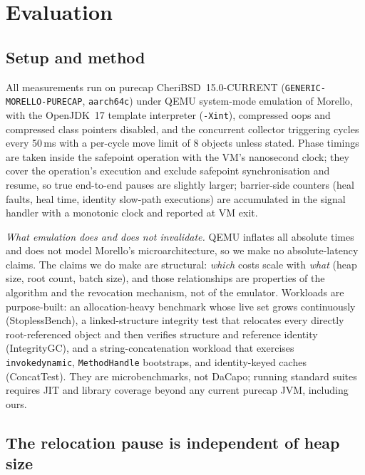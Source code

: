 \documentclass[acmsmall,nonacm,screen]{acmart}
\begin{document}
\section{Evaluation}
\label{sec:eval}

\subsection{Setup and method}
\label{sec:eval:setup}

All measurements run on purecap CheriBSD~15.0-CURRENT
(\texttt{GENERIC-MORELLO-PURECAP}, \texttt{aarch64c}) under QEMU
system-mode emulation of Morello, with the OpenJDK~17 template
interpreter (\texttt{-Xint}), compressed oops and compressed class
pointers disabled, and the concurrent collector triggering cycles every
50\,ms with a per-cycle move limit of 8 objects unless stated. Phase timings are taken inside the safepoint operation with the VM's
nanosecond clock; they cover the operation's execution and exclude
safepoint synchronisation and resume, so true end-to-end pauses are
slightly larger; barrier-side counters (heal faults, heal time, identity
slow-path executions) are accumulated in the signal handler with a
monotonic clock and reported at VM exit.

\emph{What emulation does and does not invalidate.} QEMU inflates all
absolute times and does not model Morello's microarchitecture, so we
make no absolute-latency claims. The claims we do make are structural:
\emph{which} costs scale with \emph{what} (heap size, root count, batch
size), and those relationships are properties of the algorithm and the
revocation mechanism, not of the emulator. Workloads are purpose-built:
an allocation-heavy benchmark whose live set grows continuously
(\textsf{StoplessBench}), a linked-structure integrity test that relocates every directly
root-referenced object and then verifies structure and reference
identity (\textsf{IntegrityGC}), and a string-concatenation workload
that exercises \texttt{invokedynamic}, \texttt{MethodHandle}
bootstraps, and identity-keyed caches (\textsf{ConcatTest}). They are
microbenchmarks, not DaCapo; running standard suites requires JIT and
library coverage beyond any current purecap JVM, including ours.

\subsection{The relocation pause is independent of heap size}
\label{sec:eval:flat}
\end{document}
